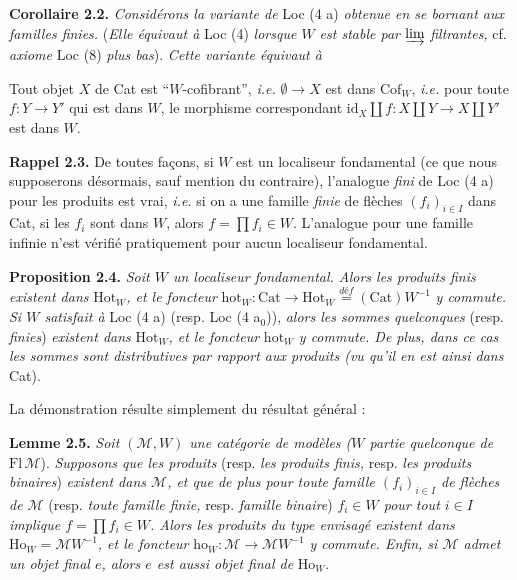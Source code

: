 \documentclass[11pt]{article}
\newcommand{\printedpage}[1]{\marginpar{\footnotesize p.~#1}}
\newcommand{\msp}[1]{\marginpar{\footnotesize [#1]}}
\begin{document}
\textbf{Corollaire 2.2.} \textit{Considérons la variante de} Loc (4 a) \textit{obtenue en se bornant aux familles finies.} (\textit{Elle équivaut à} Loc (4) \textit{lorsque $W$ est stable par} $\varinjlim$ \textit{filtrantes,} cf. \textit{axiome} Loc (8) \textit{plus bas}). \textit{Cette variante équivaut à}

\begin{description}[leftmargin=7.5em, labelwidth=6.5em]
\item[Loc (4 a$_0$)] Tout objet $X$ de Cat est “$W$-cofibrant”, \textit{i.e.} $\emptyset \longrightarrow X$ est dans $\mathrm{Cof}_W$, \textit{i.e.} pour toute $f : Y \longrightarrow Y'$ qui est dans $W$, le morphisme correspondant $\mathrm{id}_X \amalg f : X \amalg Y \longrightarrow X \amalg Y'$ est dans $W$.
\end{description}

\textbf{Rappel 2.3.} De toutes façons, si $W$ est un localiseur fondamental (ce que nous supposerons désormais, sauf mention du contraire), l'analogue \textit{fini} de Loc (4 a) pour les produits est vrai, \textit{i.e.} si on a une famille \textit{finie} de flèches $(f_i)_{i\in I}$ dans Cat, si les $f_i$ sont dans $W$, alors $f = \prod f_i \in W$. L'analogue pour une famille infinie n'est vérifié pratiquement pour aucun localiseur fondamental.

\msp{page 10}\textbf{Proposition 2.4.} \textit{Soit $W$ un localiseur fondamental. Alors les produits finis existent dans} $\mathrm{Hot}_W$\textit{, et le foncteur} $\mathrm{hot}_W : \mathrm{Cat} \longrightarrow \mathrm{Hot}_W \overset{\textit{déf}}{=} (\mathrm{Cat})W^{-1}$ \textit{y commute. Si $W$ satisfait à} Loc (4 a) (resp. Loc (4 a$_0$)), \textit{alors les sommes quelconques} (resp. \textit{finies}) \textit{existent dans} $\mathrm{Hot}_W$\textit{, et le foncteur} $\mathrm{hot}_W$ \textit{y commute. De plus, dans ce cas les sommes sont distributives par rapport aux produits (vu qu'il en est ainsi dans} Cat).

La démonstration résulte simplement du résultat général :

\textbf{Lemme 2.5.} \textit{Soit $(\mathcal{M}, W)$ une catégorie de modèles ($W$ partie quelconque de} $\mathrm{Fl}\,\mathcal{M}$). \textit{Supposons que les produits} (resp. \textit{les produits finis,} resp. \textit{les produits binaires}) \textit{existent dans $\mathcal{M}$, et que de plus pour toute famille $(f_i)_{i\in I}$ de flèches de $\mathcal{M}$} (resp. \textit{toute famille finie,}
\printedpage{6}
resp. \textit{famille binaire}) \textit{$f_i \in W$ pour tout $i \in I$ implique $f = \prod f_i \in W$. Alors les produits du type envisagé existent dans} $\mathrm{Ho}_W = \mathcal{M}W^{-1}$\textit{, et le foncteur} $\mathrm{ho}_W : \mathcal{M} \longrightarrow \mathcal{M}W^{-1}$ \textit{y commute. Enfin, si $\mathcal{M}$ admet un objet final $e$, alors $e$ est aussi objet final de} $\mathrm{Ho}_W$.
\end{document}
